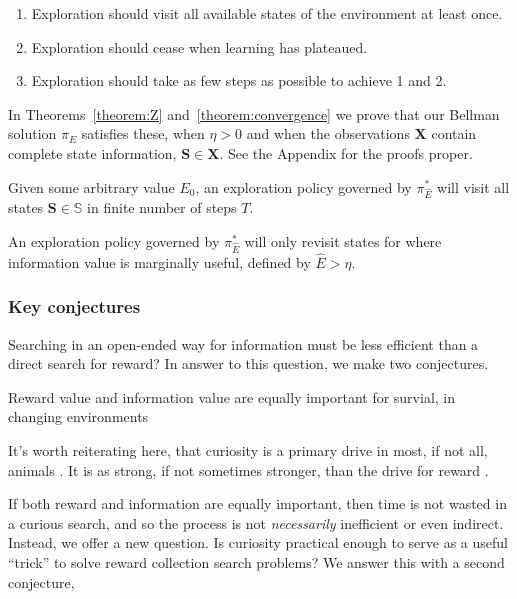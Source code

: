 \begin{enumerate}
	\item Exploration should visit all available states of the environment at least once.
	\item Exploration should cease when learning has plateaued.
	\item Exploration should take as few steps as possible to achieve 1 and 2.
\end{enumerate}

In Theorems~\ref{theorem:Z} and~\ref{theorem:convergence} we prove that our Bellman solution $\pi_E$ satisfies these, when $\eta > 0$ and when the observations $\mathbf{X}$ contain complete state information, $\mathbf{S} \in \mathbf{X}$. See the Appendix for the proofs proper.

\begin{theorem} 
	\label{theorem:Z} 
	Given some arbitrary value $E_0$, an exploration policy governed by $\pi^*_{\hat E}$ will visit all states $\mathbf{S} \in \mathbb{S}$ in finite number of steps $T$.
\end{theorem}

\begin{theorem} 
	\label{theorem:convergence} 
	An exploration policy governed by $\pi^*_{\hat E}$ will only revisit states for where information value is marginally useful, defined by $\hat E > \eta$.  
\end{theorem}


\subsubsection*{Key conjectures}
 Searching in an open-ended way for information must be less efficient than a direct search for reward? In answer to this question, we make two conjectures.

\begin{conjecture}
	Reward value and information value are equally important for survial, in changing environments 
\end{conjecture}

It's worth reiterating here, that curiosity is a primary drive in most, if not all, animals \cite{Inglis2001}. It is as strong, if not sometimes stronger, than the drive for reward \cite{Loewenstein1994,Kidd2015,Gottlieb2018}.

If both reward and information are equally important, then time is not wasted in a curious search, and so the process is not \textit{necessarily} inefficient or even indirect. Instead, we offer a new question. Is curiosity practical enough to serve as a useful ``trick'' to solve reward collection search problems? We answer this with a second conjecture,

